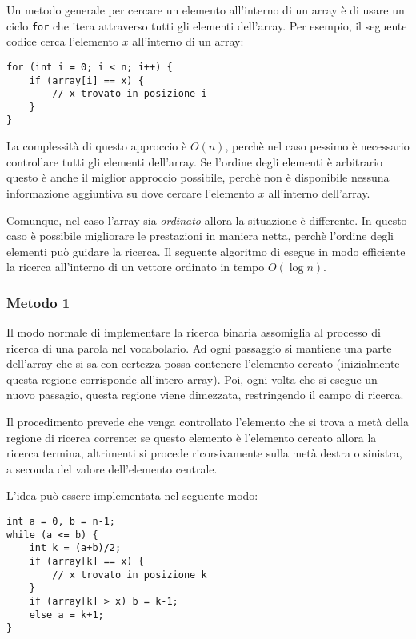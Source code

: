 
Un metodo generale per cercare un elemento 
all'interno di un array è di usare un ciclo \texttt{for}
che itera attraverso tutti gli elementi dell'array.
Per esempio, il seguente codice cerca l'elemento $x$
all'interno di un array:

\begin{lstlisting}
for (int i = 0; i < n; i++) {
    if (array[i] == x) {
        // x trovato in posizione i
    }
}
\end{lstlisting}

La complessità di questo approccio è $O(n)$,
perchè nel caso pessimo è necessario controllare tutti
gli elementi dell'array.
Se l'ordine degli elementi è arbitrario 
questo è anche il miglior approccio possibile,
perchè non è disponibile nessuna informazione 
aggiuntiva su dove cercare l'elemento $x$ 
all'interno dell'array.

Comunque, nel caso l'array sia \emph{ordinato}
allora la situazione è differente.
In questo caso è possibile migliorare le prestazioni
in maniera netta, perchè l'ordine degli elementi 
può guidare la ricerca.
Il seguente algoritmo di 
esegue in modo efficiente la ricerca all'interno di 
un vettore ordinato in tempo $O(\log n)$. 

\subsubsection{Metodo 1}

Il modo normale di implementare la ricerca binaria
assomiglia al processo di ricerca di una parola nel vocabolario. 
Ad ogni passaggio si mantiene una parte dell'array
che si sa con certezza possa contenere l'elemento cercato 
(inizialmente questa regione corrisponde all'intero array).
Poi, ogni volta che si esegue un nuovo passagio,
questa regione viene dimezzata, restringendo il campo di ricerca.

Il procedimento prevede che venga controllato l'elemento
che si trova a metà della regione di ricerca corrente: se questo
elemento è l'elemento cercato allora la ricerca termina, altrimenti 
si procede ricorsivamente sulla metà destra o sinistra, 
a seconda del valore dell'elemento centrale.

L'idea può essere implementata nel seguente modo:

\begin{lstlisting}
int a = 0, b = n-1;
while (a <= b) {
    int k = (a+b)/2;
    if (array[k] == x) {
        // x trovato in posizione k
    }
    if (array[k] > x) b = k-1;
    else a = k+1;
}
\end{lstlisting}

